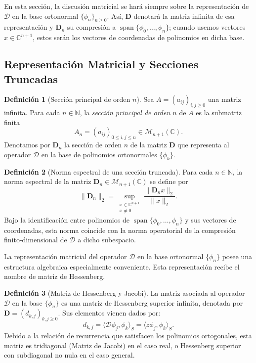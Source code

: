 \documentclass[12pt,a4paper]{article}
\theoremstyle{definition}
\newtheorem{definition}{Definición}
\theoremstyle{remark}
\begin{document}
En esta sección, la discusión matricial se hará siempre sobre la representación de $\mathcal{D}$ en la base ortonormal $\{\phi_n\}_{n\ge 0}$. Así, $\mathbf{D}$ denotará la matriz infinita de esa representación y $\mathbf{D}_n$ su compresión a $\operatorname{span}\{\phi_0,\dots,\phi_n\}$; cuando usemos vectores $x \in \mathbb{C}^{n+1}$, estos serán los vectores de coordenadas de polinomios en dicha base.

\subsection{Representación Matricial y Secciones Truncadas}

\begin{definition}[Sección principal de orden $n$]\label{def:seccion_truncada}
	Sea $A = (a_{ij})_{i,j \geq 0}$ una matriz infinita. Para cada $n \in \mathbb{N}$, la \emph{sección principal de orden $n$} de $A$ es la submatriz finita
	\[
		A_n = (a_{ij})_{0 \leq i,j \leq n} \in \mathcal{M}_{n+1}(\mathbb{C}).
	\]
	Denotamos por $\mathbf{D}_n$ la sección de orden $n$ de la matriz $\mathbf{D}$ que representa al operador $\mathcal{D}$ en la base de polinomios ortonormales $\{\phi_k\}$.
\end{definition}

\begin{definition}[Norma espectral de una sección truncada]\label{def:norma_espectral_truncada}
	Para cada $n \in \mathbb{N}$, la norma espectral de la matriz $\mathbf{D}_n \in \mathcal{M}_{n+1}(\mathbb{C})$ se define por
	\[
		\|\mathbf{D}_n\|_2 = \sup_{\substack{x \in \mathbb{C}^{n+1} \\ x \neq 0}} \frac{\|\mathbf{D}_n x\|_2}{\|x\|_2}.
	\]
	Bajo la identificación entre polinomios de $\operatorname{span}\{\phi_0,\dots,\phi_n\}$ y sus vectores de coordenadas, esta norma coincide con la norma operatorial de la compresión finito-dimensional de $\mathcal{D}$ a dicho subespacio.
\end{definition}

La representación matricial del operador $\mathcal{D}$ en la base ortonormal $\{\phi_n\}$ posee una estructura algebraica especialmente conveniente. Esta representación recibe el nombre de matriz de Hessenberg.

\begin{definition}[Matriz de Hessenberg y Jacobi] \label{def:hessenberg}
	La matriz asociada al operador $\mathcal{D}$ en la base $\{\phi_n\}$ es una matriz de Hessenberg superior infinita, denotada por $\mathbf{D} = (d_{k,j})_{k,j\ge 0}$. Sus elementos vienen dados por:
	\begin{equation}
		d_{k,j} = \langle \mathcal{D}\phi_j, \phi_k \rangle_S = \langle z \phi_j, \phi_k \rangle_S.
	\end{equation}
	Debido a la relación de recurrencia que satisfacen los polinomios ortogonales, esta matriz es tridiagonal (Matriz de Jacobi) en el caso real, o Hessenberg superior con subdiagonal no nula en el caso general.
\end{definition}
\end{document}
